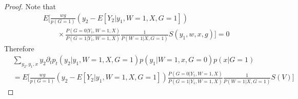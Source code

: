 \documentclass[uplatex,dvipdfmx]{jsarticle}
\begin{document}
\begin{proof}
    Note that
    \begin{align*}
        &E \biggl[  \frac{ w g }{ p (G = 1) } ( y_2 - E [ Y_2 | y_1 , W = 1, X, G =1 ] )\\
        &\qquad\times\frac{ P( G =0 | Y_1 , W=1 , X ) }{ P(G=1 | Y_1 , W=1 , X ) }\frac{1}{P( W=1 | X , G=1)}    S (  y_1 , w, x , g) \biggr] = 0
    \end{align*}
    Therefore
    \begin{align*}
        &\sum_{ y_2 ,y_1,x} y_2 \partial_t p_t ( y_2| y_1 , W= 1, X , G= 1) p ( y_1 | W =1 , x, G= 0 ) p( x | G =1 ) \\
        &= E \biggl[  \frac{ w g }{ p (G = 1) } ( y_2 - E [ Y_2 | y_1 , W = 1, X, G =1 ] )     \frac{ P( G =0 | Y_1 , W=1 , X ) }{ P(G=1 | Y_1 , W=1 , X ) }\frac{1}{P( W=1 | X , G=1)}   S ( V) \biggr]
    \end{align*}


\end{proof}
\end{document}
